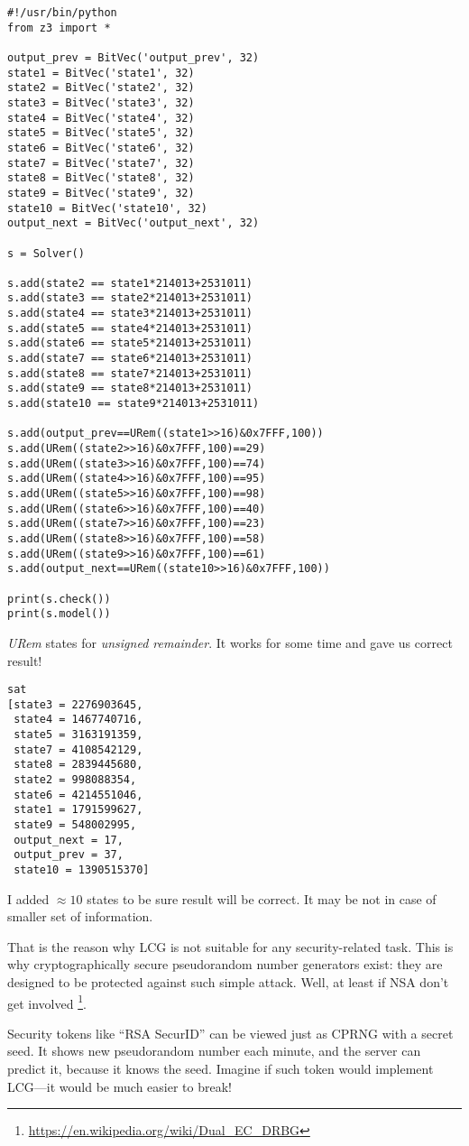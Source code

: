 \begin{lstlisting}
#!/usr/bin/python
from z3 import *

output_prev = BitVec('output_prev', 32)
state1 = BitVec('state1', 32)
state2 = BitVec('state2', 32)
state3 = BitVec('state3', 32)
state4 = BitVec('state4', 32)
state5 = BitVec('state5', 32)
state6 = BitVec('state6', 32)
state7 = BitVec('state7', 32)
state8 = BitVec('state8', 32)
state9 = BitVec('state9', 32)
state10 = BitVec('state10', 32)
output_next = BitVec('output_next', 32)

s = Solver()

s.add(state2 == state1*214013+2531011)
s.add(state3 == state2*214013+2531011)
s.add(state4 == state3*214013+2531011)
s.add(state5 == state4*214013+2531011)
s.add(state6 == state5*214013+2531011)
s.add(state7 == state6*214013+2531011)
s.add(state8 == state7*214013+2531011)
s.add(state9 == state8*214013+2531011)
s.add(state10 == state9*214013+2531011)

s.add(output_prev==URem((state1>>16)&0x7FFF,100))
s.add(URem((state2>>16)&0x7FFF,100)==29)
s.add(URem((state3>>16)&0x7FFF,100)==74)
s.add(URem((state4>>16)&0x7FFF,100)==95)
s.add(URem((state5>>16)&0x7FFF,100)==98)
s.add(URem((state6>>16)&0x7FFF,100)==40)
s.add(URem((state7>>16)&0x7FFF,100)==23)
s.add(URem((state8>>16)&0x7FFF,100)==58)
s.add(URem((state9>>16)&0x7FFF,100)==61)
s.add(output_next==URem((state10>>16)&0x7FFF,100))

print(s.check())
print(s.model())
\end{lstlisting}

\textit{URem} states for \textit{unsigned remainder}.
It works for some time and gave us correct result!

\begin{lstlisting}
sat
[state3 = 2276903645,
 state4 = 1467740716,
 state5 = 3163191359,
 state7 = 4108542129,
 state8 = 2839445680,
 state2 = 998088354,
 state6 = 4214551046,
 state1 = 1791599627,
 state9 = 548002995,
 output_next = 17,
 output_prev = 37,
 state10 = 1390515370]
\end{lstlisting}

I added $\approx 10$ states to be sure result will be correct.
It may be not in case of smaller set of information.

That is the reason why \ac{LCG} is not suitable for any security-related task.
This is why cryptographically secure pseudorandom number generators exist:
they are designed to be protected against such simple attack.
Well, at least if \ac{NSA} don't get involved
\footnote{\url{https://en.wikipedia.org/wiki/Dual_EC_DRBG}}.

Security tokens like ``RSA SecurID'' can be viewed just as \ac{CPRNG} with a secret seed.
It shows new pseudorandom number each minute, and the server can predict it, because it knows the seed.
Imagine if such token would implement \ac{LCG}---it would be much easier to break!

